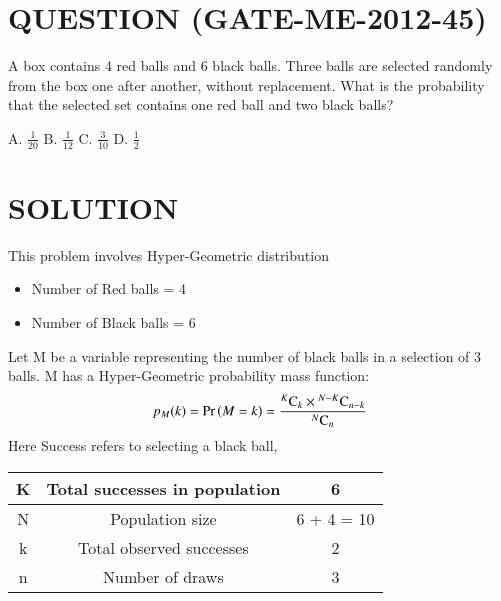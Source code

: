 \documentclass[journal,12pt,twocolumn]{IEEEtran}
\begin{document}
\section*{QUESTION (GATE-ME-2012-45)}
A box contains 4 red balls and 6 black balls. Three balls are selected randomly from the box one after another, 
without replacement. What is the probability that the selected set contains one red ball and two black balls?
\begin{center}
    A. $\displaystyle{\frac{1}{20}}$ \hspace{0.5cm}B. $\displaystyle{\frac{1}{12}}$ \hspace{0.5cm}C. $\displaystyle{\frac{3}{10}}$ \hspace{0.5cm}D. $\displaystyle{\frac{1}{2}}$
\end{center}
\section*{SOLUTION}
This problem involves Hyper-Geometric distribution
\begin{itemize}
    \item Number of Red balls = 4
    \item Number of Black balls = 6
\end{itemize}
Let M be a variable representing the number of black balls in a selection of 3 balls.
M has a \newline Hyper-Geometric probability mass function:
\begin{equation}
    p_M(k) = \Pr\left(M = k\right) = \frac{{}^{K}\mathrm{C}_{k} \times {}^{N-K}\mathrm{C}_{n-k}}{{}^{N}\mathrm{C}_{n}}
\end{equation}
Here Success refers to selecting a black ball,
\begin{table}[H]
    \begin{center}
        \resizebox{\columnwidth}{!}
        {
            \begin{tabular}{|c|c|c|}
                \hline
                K & Total successes in population & 6\\
                \hline
                N & Population size & 6 + 4 = 10\\
                \hline
                k & Total observed successes & 2\\
                \hline
                n & Number of draws & 3\\
                \hline
            \end{tabular}
        }
    \end{center}
\end{table}
\end{document}
